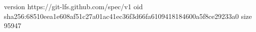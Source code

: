 version https://git-lfs.github.com/spec/v1
oid sha256:68510eea1e608af51c27a01ac41ec36f3d66fa6109418184600a5f8ce29233a0
size 95947
